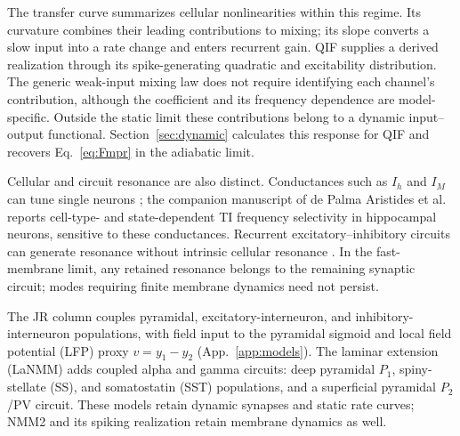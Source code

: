 \documentclass[11pt,a4paper]{article}
\begin{document}
The transfer curve summarizes cellular nonlinearities within this regime. Its
curvature combines their leading contributions to mixing; its slope converts a
slow input into a rate change and enters recurrent gain. QIF supplies a derived
realization through its spike-generating quadratic and excitability distribution.
The generic weak-input mixing law does not require identifying each channel's
contribution, although the coefficient and its frequency dependence are
model-specific. Outside the static limit these contributions belong to a dynamic
input--output functional. Section~\ref{sec:dynamic} calculates this response for
QIF and recovers Eq.~\eqref{eq:Fmpr} in the adiabatic limit.

Cellular and circuit resonance are also distinct. Conductances such as $I_h$ and
$I_M$ can tune single neurons \cite{hutcheonyarom2000}; the companion manuscript of
de Palma Aristides et al.\ \cite{depalma2026ti} reports cell-type- and state-dependent
TI frequency selectivity in hippocampal neurons, sensitive to these conductances.
Recurrent excitatory--inhibitory circuits can generate resonance without intrinsic
cellular resonance \cite{brunelhakim1999,brunelwang2003}. In the fast-membrane limit,
any retained resonance belongs to the remaining synaptic circuit; modes requiring
finite membrane dynamics need not persist.

The JR column couples pyramidal, excitatory-interneuron, and inhibitory-interneuron
populations, with field input to the pyramidal sigmoid and local field potential
(LFP) proxy $v=y_1-y_2$ (App.~\ref{app:models}). The laminar extension (LaNMM)
\cite{ruffini2025cfc,sanchezTodo2023} adds coupled alpha and gamma circuits: deep
pyramidal $P_1$, spiny-stellate (SS), and somatostatin (SST) populations, and a
superficial pyramidal $P_2$/PV circuit. These models retain dynamic synapses and
static rate curves; NMM2 and its spiking realization retain membrane dynamics as well.
\end{document}
